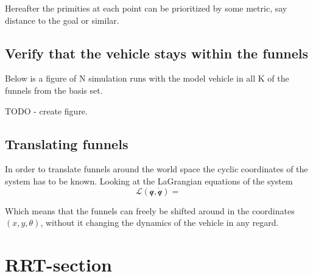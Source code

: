Hereafter the primities at each point can be prioritized by some metric, say
distance to the goal or similar.

\subsection{Verify that the vehicle stays within the funnels}

Below is a figure of N simulation runs with the model vehicle in all K of the
funnels from the basis set.

TODO - create figure.

\subsection{Translating funnels}

In order to translate funnels around the world space the cyclic coordinates of
the system has to be known. Looking at the LaGrangian equations of the system
\begin{equation}
  \mathcal{L(q,\dot{q})} = 
\end{equation}

Which means that the funnels can freely be shifted around in the coordinates
\(\left( x, y, \theta \right)\), without it changing the dynamics of the vehicle
in any regard.


\section{RRT-section}

